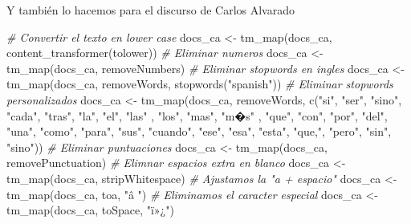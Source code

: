 \documentclass[
]{article}
\newenvironment{Shaded}{\begin{snugshade}}{\end{snugshade}}
\newcommand{\CommentTok}[1]{\textcolor[rgb]{0.56,0.35,0.01}{\textit{#1}}}
\newcommand{\FunctionTok}[1]{\textcolor[rgb]{0.00,0.00,0.00}{#1}}
\newcommand{\NormalTok}[1]{#1}
\newcommand{\OtherTok}[1]{\textcolor[rgb]{0.56,0.35,0.01}{#1}}
\newcommand{\StringTok}[1]{\textcolor[rgb]{0.31,0.60,0.02}{#1}}
\begin{document}
Y también lo hacemos para el discurso de Carlos Alvarado

\begin{Shaded}
\begin{Highlighting}[]
\CommentTok{\# Convertir el texto en lower case}
\NormalTok{docs\_ca }\OtherTok{\textless{}{-}} \FunctionTok{tm\_map}\NormalTok{(docs\_ca, }\FunctionTok{content\_transformer}\NormalTok{(tolower))}
\CommentTok{\# Eliminar numeros}
\NormalTok{docs\_ca }\OtherTok{\textless{}{-}} \FunctionTok{tm\_map}\NormalTok{(docs\_ca, removeNumbers)}
\CommentTok{\# Eliminar stopwords en ingles}
\NormalTok{docs\_ca }\OtherTok{\textless{}{-}} \FunctionTok{tm\_map}\NormalTok{(docs\_ca, removeWords, }\FunctionTok{stopwords}\NormalTok{(}\StringTok{"spanish"}\NormalTok{))}
\CommentTok{\# Eliminar stopwords personalizados}
\NormalTok{docs\_ca }\OtherTok{\textless{}{-}} \FunctionTok{tm\_map}\NormalTok{(docs\_ca, removeWords, }\FunctionTok{c}\NormalTok{(}\StringTok{"si"}\NormalTok{, }\StringTok{"ser"}\NormalTok{, }\StringTok{"sino"}\NormalTok{, }\StringTok{"cada"}\NormalTok{, }\StringTok{"tras"}\NormalTok{, }\StringTok{"la"}\NormalTok{, }\StringTok{"el"}\NormalTok{, }\StringTok{"las"}\NormalTok{ , }\StringTok{"los"}\NormalTok{, }\StringTok{"mas"}\NormalTok{, }\StringTok{"m�s"}\NormalTok{ ,                                       }\StringTok{"que"}\NormalTok{, }\StringTok{"con"}\NormalTok{, }\StringTok{"por"}\NormalTok{, }\StringTok{"del"}\NormalTok{, }\StringTok{"una"}\NormalTok{, }\StringTok{"como"}\NormalTok{, }\StringTok{"para"}\NormalTok{, }\StringTok{"sus"}\NormalTok{, }\StringTok{"cuando"}\NormalTok{, }\StringTok{"ese"}\NormalTok{, }\StringTok{"esa"}\NormalTok{,}
                                          \StringTok{"esta"}\NormalTok{, }\StringTok{"que,"}\NormalTok{, }\StringTok{"pero"}\NormalTok{, }\StringTok{"sin"}\NormalTok{, }\StringTok{"sino"}\NormalTok{))}
\CommentTok{\# Eliminar puntuaciones}
\NormalTok{docs\_ca }\OtherTok{\textless{}{-}} \FunctionTok{tm\_map}\NormalTok{(docs\_ca, removePunctuation)}
\CommentTok{\# Elimnar espacios extra en blanco}
\NormalTok{docs\_ca }\OtherTok{\textless{}{-}} \FunctionTok{tm\_map}\NormalTok{(docs\_ca, stripWhitespace)}
\CommentTok{\# Ajustamos la "a + espacio" }
\NormalTok{docs\_ca }\OtherTok{\textless{}{-}} \FunctionTok{tm\_map}\NormalTok{(docs\_ca, toa, }\StringTok{"â "}\NormalTok{)}
\CommentTok{\# Eliminamos el caracter especial}
\NormalTok{docs\_ca }\OtherTok{\textless{}{-}} \FunctionTok{tm\_map}\NormalTok{(docs\_ca, toSpace, }\StringTok{"ï»¿"}\NormalTok{)}
\end{Highlighting}
\end{Shaded}
\end{document}
